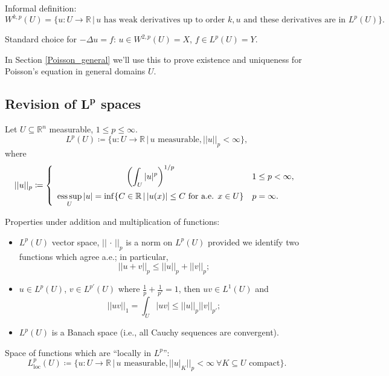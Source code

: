 \documentclass[12pt]{article}
\DeclareMathOperator*{\esssup}{ess\,sup}
\theoremstyle{definition}
\begin{document}
Informal definition:
\[W^{k,p}(U)=\{u:U\rightarrow\mathbb R\,|\,u\text{ has weak derivatives up to order }k,u\text{ and these derivatives are in }L^p(U)\}.\]

Standard choice for $-\Delta u=f$: $u\in W^{2,p}(U)=X$, $f\in L^p(U)=Y$.

In Section \ref{Poisson_general} we'll use this to prove existence and uniqueness for Poisson's equation in general domains $U$.

\setcounter{subsection}{-1}
\subsection[Revision of \texorpdfstring{$L^p$}{L\^{}p} spaces]{Revision of \texorpdfstring{$\boldsymbol{L^p}$}{L\^p} spaces}
Let $U\subseteq\mathbb R^n$ measurable, $1\leq p\leq\infty$.
\[L^p(U)\coloneqq\{u:U\rightarrow\mathbb R\,|\,u\text{ measurable},||u||_p<\infty\},\]
where
\[||u||_p\coloneqq\left\{\begin{array}{cl}\displaystyle{\left(\int_U|u|^p\right)^{1/p}}&1\leq p<\infty,\vspace{2mm}\\\displaystyle{\esssup_U|u|=\inf\{C\in\mathbb R\,|\,|u(x)|\leq C\text{ for a.e. }x\in U\}}&p=\infty.\end{array}\right.\]

Properties under addition and multiplication of functions:
\begin{itemize}
\item $L^p(U)$ vector space, $||\,\cdot\,||_p$ is a norm on $L^p(U)$ provided we identify two functions which agree a.e.; in particular,
\begin{equation}\tag{Minkowski's inequality}
||u+v||_p\leq||u||_p+||v||_p;
\end{equation}
\item $u\in L^p(U)$, $v\in L^{p'}(U)$ where $\frac1p+\frac1{p'}=1$, then $uv\in L^1(U)$ and
\begin{equation}\tag{H\"older's inequality}
||uv||_1=\int_U|uv|\leq||u||_p||v||_{p'};
\end{equation}
\item $L^p(U)$ is a Banach space (i.e., all Cauchy sequences are convergent).
\end{itemize}

Space of functions which are ``locally in $L^p$'':
\[L_\text{loc}^p(U)\coloneqq\big\{u:U\rightarrow\mathbb R\,\big|\,u\text{ measurable},\big|\big|u|_K\big|\big|_p<\infty\ \forall K\subseteq U\text{ compact}\big\}.\]
\end{document}
